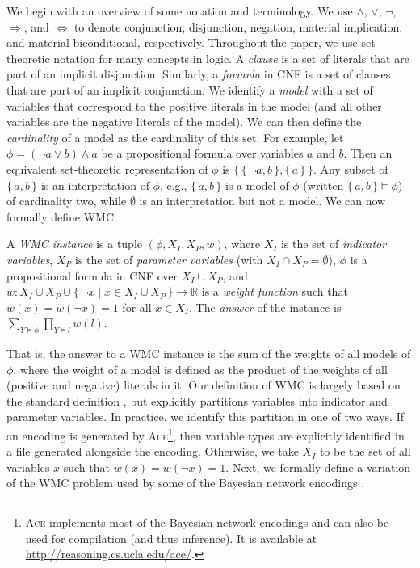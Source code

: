 
We begin with an overview of some notation and terminology. We use $\land$,
$\lor$, $\neg$, $\Rightarrow$, and $\Leftrightarrow$ to denote conjunction,
disjunction, negation, material implication, and material biconditional,
respectively. Throughout the paper, we use set-theoretic notation for many
concepts in logic. A \emph{clause} is a set of literals that are part of an
implicit disjunction. Similarly, a \emph{formula} in CNF is a set of clauses
that are part of an implicit conjunction. We identify a \emph{model} with a set
of variables that correspond to the positive literals in the model (and all
other variables are the negative literals of the model). We can then define the
\emph{cardinality} of a model as the cardinality of this set. For example, let
$\phi = (\neg a \lor b) \land a$ be a propositional formula over variables $a$
and $b$. Then an equivalent set-theoretic representation of $\phi$ is
$\{\, \{\, \neg a, b \,\}, \{\, a \,\} \,\}$. Any subset of $\{\, a, b \,\}$ is
an interpretation of $\phi$, e.g., $\{\, a, b \,\}$ is a model of $\phi$
(written $\{\, a, b \,\} \models \phi$) of cardinality two, while $\emptyset$ is
an interpretation but not a model. We can now formally define WMC\@.

\begin{definition}[WMC]\label{def:wmc}
  A \emph{WMC instance} is a tuple $(\phi, X_I, X_P, w)$, where $X_I$ is the set
  of \emph{indicator variables}, $X_P$ is the set of \emph{parameter variables}
  (with $X_I \cap X_P = \emptyset$), $\phi$ is a propositional formula in CNF
  over $X_I \cup X_P$, and
  $w\colon X_I \cup X_P \cup \{\, \neg x \mid x \in X_I \cup X_P \,\} \to \mathbb{R}$
  is a \emph{weight function} such that $w(x) = w(\neg x) = 1$ for all
  $x \in X_I$. The \emph{answer} of the instance is
  $\sum_{Y \models \phi} \prod_{Y \models l} w(l)$.
\end{definition}

That is, the answer to a WMC instance is the sum of the weights of all models of
$\phi$, where the weight of a model is defined as the product of the weights of
all (positive and negative) literals in it. Our definition of WMC is largely
based on the standard definition \citep{DBLP:journals/ai/ChaviraD08}, but
explicitly partitions variables into indicator and parameter variables. In
practice, we identify this partition in one of two ways. If an encoding is
generated by \textsc{Ace}\footnote{\textsc{Ace}
  \citep{DBLP:journals/ai/ChaviraD08} implements most of the Bayesian network
  encodings and can also be used for compilation (and thus inference). It is
  available at \url{http://reasoning.cs.ucla.edu/ace/}.}, then variable types
are explicitly identified in a file generated alongside the encoding. Otherwise,
we take $X_I$ to be the set of all variables $x$ such that $w(x) = w(\neg x) =
1$. Next, we formally define a variation of the WMC problem used by some of the
Bayesian network encodings
\citep{DBLP:conf/ijcai/ChaviraD05,DBLP:conf/sat/ChaviraD06}.

